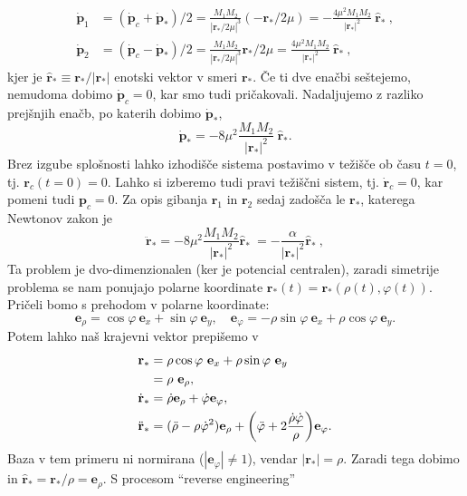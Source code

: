 \documentclass[12pt, a4paper]{article}
\renewcommand{\r}{
    \ensuremath{\mathbf{r}}
}
\newcommand{\p}{
    \ensuremath{\mathbf{p}}
}
\newcommand{\ee}{
    \ensuremath{\mathbf{e}}
}
\begin{document}
\begin{align*}
    \dot{\p}_1 &= (\dot{\p}_c + \dot{\p}_*)/2 = \frac{M_1M_2}{|\r_*/2\mu|^3}(-\r_*/2\mu)
        = -\frac{4\mu^2 M_1M_2}{|\r_*|^2}\ \hat{\r}_*\ , \\
    \dot{\p}_2 &= (\dot{\p}_c - \dot{\p}_*)/2 = \frac{M_1M_2}{|\r_*/2\mu|^3}\r_*/2\mu
        = \frac{4\mu^2 M_1M_2}{|\r_*|^2}\ \hat{\r}_*\ ,
\end{align*}
kjer je $\hat{\r}_* \equiv \r_*/|\r_*|$ enotski vektor v smeri $\r_*$. \v Ce ti dve ena\v cbi se\v stejemo, nemudoma
dobimo $\dot{\p}_c = 0$, kar smo tudi pri\v cakovali. Nadaljujemo z razliko prej\v snjih ena\v cb, po katerih
dobimo $\dot{\p}_*$,
\begin{equation*}
    \dot{\p}_* = - 8\mu^2\frac{M_1M_2}{|\r_*|^2}\ \hat{\r}_*.
\end{equation*}
Brez izgube splo\v snosti lahko izhodi\v s\v ce sistema postavimo v te\v zi\v s\v ce ob \v casu $t = 0$, tj.
$\r_c (t = 0) = 0$. Lahko si izberemo tudi pravi te\v zi\v s\v cni sistem, tj. $\dot{\r}_c = 0$, kar pomeni
tudi $\p_c = 0$. Za opis gibanja $\r_1$ in $\r_2$ sedaj zado\v s\v ca le $\r_*$, katerega Newtonov zakon je
\begin{equation}
    \ddot{\r}_* = -8\mu^2 \frac{M_1M_2}{|\r_*|^2}\hat{\r}_*\ = - \frac{\alpha}{|\r_*|^2}\hat{\r}_*\ ,
    \label{newton}
\end{equation}
Ta problem je dvo-dimenzionalen (ker je potencial centralen), zaradi simetrije problema se nam ponujajo polarne
koordinate $\r_*(t) = \r_* (\rho(t), \varphi(t))$. Pri\v celi bomo s prehodom v polarne koordinate:
\begin{equation}
    \ee_\rho = \cos\varphi\ \ee_x + \sin\varphi\ \ee_y, \quad \ee_\varphi = -\rho\sin\varphi\ \ee_x + \rho\cos\varphi\ \ee_y.
\end{equation}
Potem lahko na\v s krajevni vektor prepi\v semo v
\begin{align}
    \r_* &= \rho \cos\varphi\ \ee_x + \rho \sin\varphi\ \ee_y \notag \\
         &= \rho\ \ee_\rho, \\
    \dot{\r}_* &= \dot{\rho}\ee_\rho + \dot{\varphi}\ee_\varphi, \\
    \ddot{\r}_* &= (\ddot{\rho} - \rho\dot{\varphi}^2)\ee_\rho + \bigg(\ddot{\varphi} + 
        2\frac{\dot{\rho}\dot{\varphi}}{\rho}\bigg)\ee_\varphi.
    \label{polarne}
\end{align}
Baza v tem primeru ni normirana ($|\ee_\varphi| \neq 1$), vendar $|\r_*| = \rho$. Zaradi tega dobimo
in $\hat{\r}_* = \r_*/\rho = \ee_\rho$. S procesom "`reverse engineering"'
\end{document}

